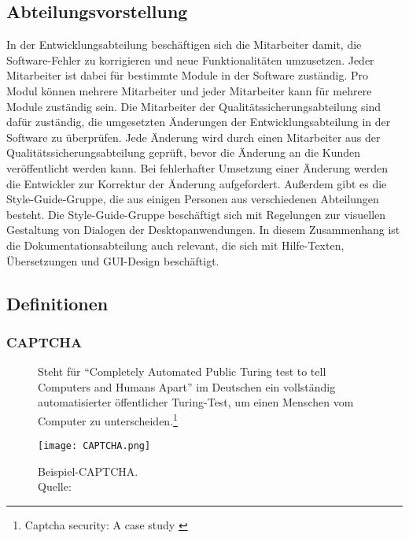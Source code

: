 \subsection{Abteilungsvorstellung}
In der Entwicklungsabteilung beschäftigen sich die Mitarbeiter damit, die Software-Fehler zu korrigieren und neue Funktionalitäten umzusetzen. Jeder Mitarbeiter ist dabei für bestimmte Module in der Software zuständig. Pro Modul können mehrere Mitarbeiter und jeder Mitarbeiter kann für mehrere Module zuständig sein. Die Mitarbeiter der Qualitätssicherungsabteilung sind dafür zuständig, die umgesetzten Änderungen der Entwicklungsabteilung in der Software zu überprüfen. Jede Änderung wird durch einen Mitarbeiter aus der Qualitätssicherungsabteilung geprüft, bevor die Änderung an die Kunden veröffentlicht werden kann. Bei fehlerhafter Umsetzung einer Änderung werden die Entwickler zur Korrektur der Änderung aufgefordert. Außerdem gibt es die Style-Guide-Gruppe, die aus einigen Personen aus verschiedenen Abteilungen besteht. Die Style-Guide-Gruppe beschäftigt sich mit Regelungen zur visuellen Gestaltung von Dialogen der Desktopanwendungen. In diesem Zusammenhang ist die Dokumentationsabteilung auch relevant, die sich mit Hilfe-Texten, Übersetzungen und \ac{GUI}-Design beschäftigt.

\subsection{Definitionen}
\label{subsec: Definitionen}

\subsubsection{CAPTCHA}
\begin{figure}[h]
	\begin{minipage}{0.5\textwidth}
		Steht für "`Completely Automated Public Turing test to tell Computers and Humans Apart"' im Deutschen ein vollständig automatisierter öffentlicher
		Turing-Test, um einen Menschen vom Computer zu unterscheiden.\footnote{Captcha security: A case study \cite{yan2009captcha}}
	\end{minipage}
	\hfill
	\begin{minipage}{0.4\textwidth}
		\texttt{[image: CAPTCHA.png]}
		\caption[Beispiel-CAPTCHA]{Beispiel-CAPTCHA. \\Quelle: \cite{yan2009captcha}}
	\end{minipage}
\end{figure}

